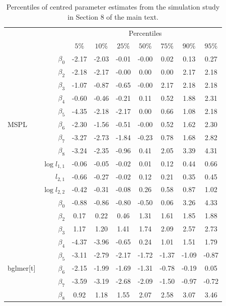 \documentclass[11pt, a4paper]{article}
\newcommand*{\bb}{\boldsymbol}
\theoremstyle{example} \newtheorem{example}{Example}[section]
\theoremstyle{theorem} \newtheorem{theorem}{Theorem}[section]
\theoremstyle{theorem }\newtheorem{proposition}{Proposition}[section]
\theoremstyle{theorem }\newtheorem{corollary}{Corollary}[section]
\def\\bbeta{\bb{\\bbeta}}
\begin{document}
\begin{table}[H]
	\centering
	\caption{Percentiles of centred parameter estimates from the simulation study in Section 8 of the main text.}\label{tab:cond_inf_full}
	\begin{tabular}{lrccccccc}
		\toprule 
		&& \multicolumn{7}{c}{Percentiles} \\ \cmidrule{3-9} 
		&&$5\%$&$10\%$&$25\%$&$50\%$&$75\%$&$90\%$&$95\%$\\ \cmidrule{3-9} 
		\cmidrule{3-9} 
		& $\beta_0$ & -2.17 & -2.03 & -0.01 & -0.00 & 0.02 & 0.13 & 0.27 \\ 
		& $\beta_2$ & -2.18 & -2.17 & -0.00 & 0.00 & 0.00 & 2.17 & 2.18 \\ 
		& $\beta_3$ & -1.07 & -0.87 & -0.65 & -0.00 & 2.17 & 2.18 & 2.18 \\ 
		& $\beta_4$ & -0.60 & -0.46 & -0.21 & 0.11 & 0.52 & 1.88 & 2.31 \\ 
		& $\beta_5$ & -4.35 & -2.18 & -2.17 & 0.00 & 0.66 & 1.08 & 2.18 \\ 
		MSPL & $\beta_6$ & -2.30 & -1.56 & -0.51 & -0.00 & 0.52 & 1.62 & 2.30 \\ 
		& $\beta_7$ & -3.27 & -2.73 & -1.84 & -0.23 & 0.78 & 1.68 & 2.82 \\ 
		& $\beta_8$ & -3.24 & -2.35 & -0.96 & 0.41 & 2.05 & 3.39 & 4.31 \\ 
		& $\log l_{1,1}$ & -0.06 & -0.05 & -0.02 & 0.01 & 0.12 & 0.44 & 0.66 \\ 
		& $l_{2,1}$ & -0.66 & -0.27 & -0.02 & 0.12 & 0.21 & 0.35 & 0.45 \\ 
		& $\log l_{2,2}$ & -0.42 & -0.31 & -0.08 & 0.26 & 0.58 & 0.87 & 1.02 \\ 
		\cmidrule{3-9} 
		& $\beta_0$ & -0.88 & -0.86 & -0.80 & -0.50 & 0.06 & 3.26 & 4.33 \\ 
		& $\beta_2$ & 0.17 & 0.22 & 0.46 & 1.31 & 1.61 & 1.85 & 1.88 \\ 
		& $\beta_3$ & 1.17 & 1.20 & 1.41 & 1.74 & 2.09 & 2.57 & 2.73 \\ 
		& $\beta_4$ & -4.37 & -3.96 & -0.65 & 0.24 & 1.01 & 1.51 & 1.79 \\ 
		& $\beta_5$ & -3.11 & -2.79 & -2.17 & -1.72 & -1.37 & -1.09 & -0.87 \\ 
		bglmer[t] & $\beta_6$ & -2.15 & -1.99 & -1.69 & -1.31 & -0.78 & -0.19 & 0.05 \\ 
		& $\beta_7$ & -3.59 & -3.19 & -2.68 & -2.09 & -1.50 & -0.97 & -0.72 \\ 
		& $\beta_8$ & 0.92 & 1.18 & 1.55 & 2.07 & 2.58 & 3.07 & 3.46 \\ 

\end{tabular}
\end{table}
\end{document}
